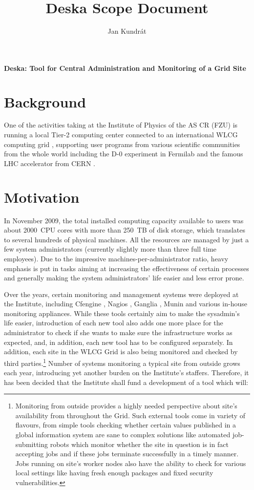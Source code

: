 \documentclass[12pt]{article}
\author{Jan Kundrát}
\title{Deska Scope Document}
\begin{document}
{\huge \textbf{Deska: Tool for Central Administration and Monitoring of a Grid Site}}

\vspace{0.5in}

\section{Background}

One of the activities taking at the Institute of Physics of the AS CR (FZU) \cite{fzu} is running a local Tier-2 computing center
connected to an international WLCG computing grid \cite{wlcg}, supporting user programs from various scientific communities from
the whole world including the D-0 experiment in Fermilab \cite{d0} and the famous LHC accelerator from CERN \cite{lhc}.

\section{Motivation}

In November 2009, the total installed computing capacity available to users was about 2000~CPU cores with more than 250~TB of
disk storage, which translates to several hundreds of physical machines.  All the resources are managed by just a few system
administrators (currently slightly more than three full time employees).  Due to the impressive machines-per-administrator ratio,
heavy emphasis is put in tasks aiming at increasing the effectiveness of certain processes and generally making the system
administrators' life easier and less error prone.

Over the years, certain monitoring and management systems were deployed at the Institute, including Cfengine \cite{cfengine},
Nagios \cite{nagios}, Ganglia \cite{ganglia}, Munin \cite{munin} and various in-house monitoring appliances.  While these tools
certainly aim to make the sysadmin's life easier, introduction of each new tool also adds one more place for the administrator to
check if she wants to make sure the infrastructure works as expected, and, in addition, each new tool has to be configured
separately.  In addition, each site in the WLCG Grid is also being monitored and checked by third parties.\footnote{Monitoring from
outside provides a highly needed perspective about site's availability from throughout the Grid.  Such external tools come in
variety of flavours, from simple tools checking whether certain values published in a global information system are sane to
complex solutions like automated job-submitting robots which monitor whether the site in question is in fact accepting jobs and if
these jobs terminate successfully in a timely manner.  Jobs running on site's worker nodes also have the ability to check for
various local settings like having fresh enough packages and fixed security vulnerabilities.}  Number of systems
monitoring a typical site from outside grows each year, introducing yet another burden on the Institute's staffers.  Therefore, it
has been decided that the Institute shall fund a development of a tool which will:
\end{document}

